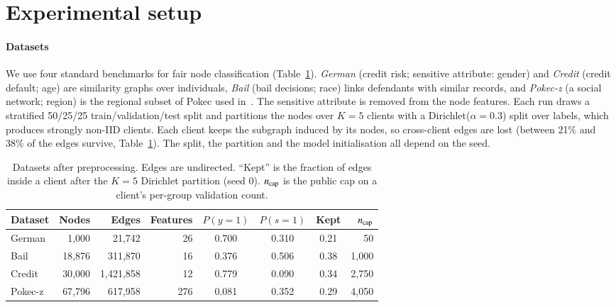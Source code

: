 \section{Experimental setup}\label{sec:setup}

\paragraph{Datasets}
We use four standard benchmarks for fair node classification (Table~\ref{tab:data}). \emph{German} (credit risk; sensitive attribute: gender) and \emph{Credit} (credit default; age) are similarity graphs over individuals, \emph{Bail} (bail decisions; race) links defendants with similar records, and \emph{Pokec-z} (a social network; region) is the regional subset of Pokec used in~\citep{dai2021say}. The sensitive attribute is removed from the node features. Each run draws a stratified 50/25/25 train/validation/test split and partitions the nodes over $K=5$ clients with a Dirichlet($\alpha=0.3$) split over labels, which produces strongly non-IID clients. Each client keeps the subgraph induced by its nodes, so cross-client edges are lost (between 21\% and 38\% of the edges survive, Table~\ref{tab:data}). The split, the partition and the model initialisation all depend on the seed.

\begin{table}[t]
\centering
\caption{Datasets after preprocessing. Edges are undirected. ``Kept'' is the fraction of edges inside a client after the $K=5$ Dirichlet partition (seed 0). $n_{\mathrm{cap}}$ is the public cap on a client's per-group validation count.}\label{tab:data}
\begin{tabular}{lrrrcccr}
\toprule
Dataset & Nodes & Edges & Features & $P(y{=}1)$ & $P(s{=}1)$ & Kept & $n_{\mathrm{cap}}$ \\
\midrule
German  & 1{,}000  & 21{,}742    & 26  & 0.700 & 0.310 & 0.21 & 50 \\
Bail    & 18{,}876 & 311{,}870   & 16  & 0.376 & 0.506 & 0.38 & 1{,}000 \\
Credit  & 30{,}000 & 1{,}421{,}858 & 12  & 0.779 & 0.090 & 0.34 & 2{,}750 \\
Pokec-z & 67{,}796 & 617{,}958   & 276 & 0.081 & 0.352 & 0.29 & 4{,}050 \\
\bottomrule
\end{tabular}
\end{table}

